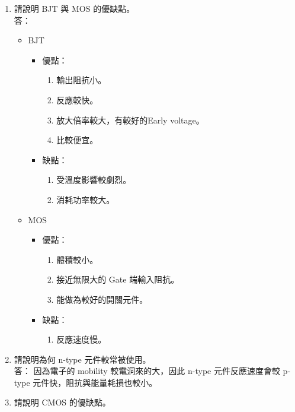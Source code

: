 \documentclass[12pt, a4paper]{article}
\begin{document}
\begin{enumerate}[itemsep=20pt, topsep=10pt]
  \item {請說明 BJT 與 MOS 的優缺點。} \\[10pt]
    答：
    \begin{itemize}
      \item BJT
        \begin{itemize}
          \item 優點：
            \begin{enumerate}[label=(\arabic*)]
              \item 輸出阻抗小。
              \item 反應較快。
              \item 放大倍率較大，有較好的Early voltage。
              \item 比較便宜。
            \end{enumerate}
          \item 缺點：
            \begin{enumerate}[label=(\arabic*)]
              \item 受溫度影響較劇烈。
              \item 消耗功率較大。
            \end{enumerate}
        \end{itemize}
      \item MOS
        \begin{itemize}
          \item 優點：
            \begin{enumerate}[label=(\arabic*)]
              \item 體積較小。
              \item 接近無限大的 Gate 端輸入阻抗。
              \item 能做為較好的開關元件。
            \end{enumerate}
          \item 缺點：
            \begin{enumerate}[label=(\arabic*)]
              \item 反應速度慢。
            \end{enumerate}
        \end{itemize}
    \end{itemize}
  \item {請說明為何 n-type 元件較常被使用。} \\[10pt]
    答：
    因為電子的 mobility 較電洞來的大，因此 n-type 元件反應速度會較
    p-type 元件快，阻抗與能量耗損也較小。
  \item {請說明 CMOS 的優缺點。} \\[10pt]

\end{enumerate}
\end{document}
